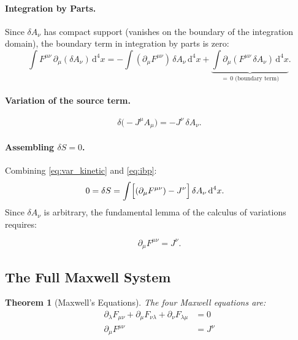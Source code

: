 \documentclass[12pt, a4paper]{article}
\theoremstyle{plain}
\newtheorem{theorem}{Theorem}[section]
\theoremstyle{definition}
\theoremstyle{remark}
\newcommand{\Action}{S}
\renewcommand{\d}{\mathrm{d}}
\begin{document}
\paragraph{Integration by Parts.}
Since $\delta A_\nu$ has compact support (vanishes on the boundary of the integration domain), the boundary term in integration by parts is zero:
\begin{equation}
  \int F^{\mu\nu}\,\partial_\mu(\delta A_\nu)\,\d^4x
  = -\int (\partial_\mu F^{\mu\nu})\,\delta A_\nu\,\d^4x
    + \underbrace{\int \partial_\mu(F^{\mu\nu}\,\delta A_\nu)\,\d^4x}_{=\,0\text{ (boundary term)}}.
  \label{eq:ibp}
\end{equation}

\paragraph{Variation of the source term.}
\[
  \delta\bigl(-J^\mu A_\mu\bigr) = -J^\nu\,\delta A_\nu.
\]

\paragraph{Assembling $\delta\Action = 0$.}
Combining \eqref{eq:var_kinetic} and \eqref{eq:ibp}:
\begin{align}
  0 = \delta\Action
  &= \int\Bigl[(\partial_\mu F^{\mu\nu}) - J^\nu\Bigr]\,\delta A_\nu\,\d^4x.
  \label{eq:variation_assembled}
\end{align}
Since $\delta A_\nu$ is arbitrary, the fundamental lemma of the calculus of variations requires:

\begin{equation}
  \boxed{\partial_\mu F^{\mu\nu} = J^\nu.}
  \label{eq:inhomogeneous_maxwell}
\end{equation}

\subsection{The Full Maxwell System}

\begin{theorem}[Maxwell's Equations]
\label{thm:maxwell}
The four Maxwell equations are:
\begin{align}
  \partial_\lambda F_{\mu\nu} + \partial_\mu F_{\nu\lambda} + \partial_\nu F_{\lambda\mu} &= 0
  \tag{M1 \& M2} \label{eq:M12} \\[4pt]
  \partial_\mu F^{\mu\nu} &= J^\nu
  \tag{M3 \& M4} \label{eq:M34}
\end{align}
\end{theorem}
\end{document}
